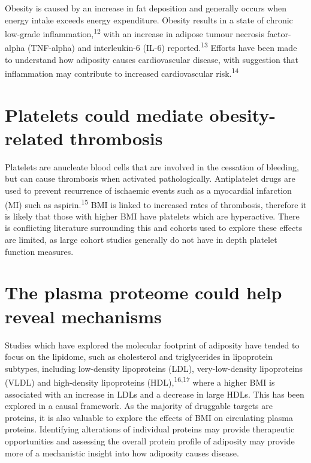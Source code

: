 \documentclass[11pt,twoside]{bristolthesis}
\begin{document}
Obesity is caused by an increase in fat deposition and generally occurs when energy intake exceeds energy expenditure. Obesity results in a state of chronic low-grade inflammation,\textsuperscript{12} with an increase in adipose tumour necrosis factor-alpha (TNF-alpha) and interleukin-6 (IL-6) reported.\textsuperscript{13} Efforts have been made to understand how adiposity causes cardiovascular disease, with suggestion that inflammation may contribute to increased cardiovascular risk.\textsuperscript{14}

\hypertarget{platelets-could-mediate-obesity-related-thrombosis}{%
\section{Platelets could mediate obesity-related thrombosis}\label{platelets-could-mediate-obesity-related-thrombosis}}

Platelets are anucleate blood cells that are involved in the cessation of bleeding, but can cause thrombosis when activated pathologically. Antiplatelet drugs are used to prevent recurrence of ischaemic events such as a myocardial infarction (MI) such as aspirin.\textsuperscript{15} BMI is linked to increased rates of thrombosis, therefore it is likely that those with higher BMI have platelets which are hyperactive. There is conflicting literature surrounding this and cohorts used to explore these effects are limited, as large cohort studies generally do not have in depth platelet function measures.

\hypertarget{the-plasma-proteome-could-help-reveal-mechanisms}{%
\section{The plasma proteome could help reveal mechanisms}\label{the-plasma-proteome-could-help-reveal-mechanisms}}

Studies which have explored the molecular footprint of adiposity have tended to focus on the lipidome, such as cholesterol and triglycerides in lipoprotein subtypes, including low-density lipoproteins (LDL), very-low-density lipoproteins (VLDL) and high-density lipoproteins (HDL),\textsuperscript{16,17} where a higher BMI is associated with an increase in LDLs and a decrease in large HDLs. This has been explored in a causal framework. As the majority of druggable targets are proteins, it is also valuable to explore the effects of BMI on circulating plasma proteins. Identifying alterations of individual proteins may provide therapeutic opportunities and assessing the overall protein profile of adiposity may provide more of a mechanistic insight into how adiposity causes disease.
\end{document}
